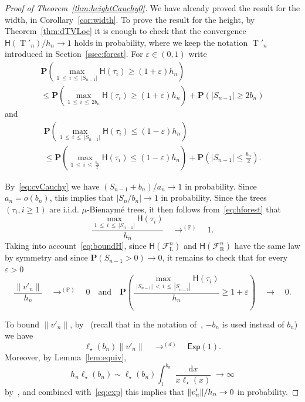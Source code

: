 \documentclass[10pt]{amsart}
\theoremstyle{definition}\newtheorem{defi}[theo]{Definition}\newtheorem{rema}[theo]{Remark}\newtheorem{exam}[theo]{Example}\newtheorem{exem}[theo]{Example}\newtheorem{nota}[theo]{Notation}
\renewcommand{\P}{\mathbb{P}}
\newcommand{\height}{\mathsf{H}}
\newcommand{\p}{\mathbf{P}}
\newcommand{\sExp}{\mathsf{Exp}}
\DeclareMathOperator{\rtree}{T}
\DeclareMathOperator{\dxseq}{d\mathit{x}}
\DeclareMathOperator{\rmL}{L}
\DeclareMathOperator{\rmR}{R}
\newcommand{\cF}{\mathcal{F}}
\begin{document}
\begin{proof}[Proof of Theorem~\ref{thm:heightCauchy0}] We have already proved the result for the width, in Corollary~\ref{cor:width}. To prove the result for the height, by Theorem~\ref{thm:dTVLoc} it is enough to check that the convergence ${\height(\rtree'_{n})}/{h_{n}} \rightarrow 1$ holds in probability, where we keep the notation $\rtree'_{n}$ introduced in Section~\ref{ssec:forest}. For $\varepsilon \in (0,1)$ write
\begin{multline*}
\p \left(\max_{1\,\leq\,i\,\leq\,|S_{n-1}|}\height(\tau_{i}) \geq (1+\varepsilon) h_{n} \right)\\
\leq \p \left(\max_{1\,\leq\,i\,\leq\,2 b_{n} }\height(\tau_{i}) \geq (1+\varepsilon) h_{n} \right)+\p \left(|S_{n-1}| \geq 2 b_{n} \right)
\end{multline*}
and
\begin{multline*}
\p \left(\max_{1\,\leq\,i\,\leq\,|S_{n-1}|}\height(\tau_{i}) \leq (1-\varepsilon) h_{n} \right)\\
\leq \p \left(\max_{1\,\leq\,i\,\leq\,\frac{ b_{n} }{2}}\height(\tau_{i}) \leq (1-\varepsilon) h_{n} \right)+\p \left(|S_{n-1}| \leq \frac{ b_{n} }{2} \right).
\end{multline*}


By~\eqref{eq:cvCauchy} we have $(S_{n-1}+b_n)/a_{n} \rightarrow 1$ in probability. Since $a_n=o(b_n)$, this implies that $|S_n/b_n| \to 1$ in probability. Since the trees $(\tau_i,i \ge 1)$ are i.i.d. $\mu$-Bienaymé trees, it then follows from~\eqref{eq:hforest} that
\begin{equation}\label{eq:cvproba}
\frac{\max_{1\, \leq\,i\,\leq\,|S_{n-1}|}\height(\tau_{i}) }{h_{n}} \quad \mathop{\longrightarrow}^{(\P)} \quad 1.
\end{equation}
Taking into account~\eqref{eq:boundH}, since $\height(\cF^{n}_{\rmL})$ and $\height(\cF^{n}_{\rmR})$ have the same law by symmetry and since $\p(S_{n-1}>0) \rightarrow 0$, it remains to check that for every $\varepsilon>0$
\begin{equation}\label{eq:rightforest}
\frac{\|v'_n\|}{h_{n}} \quad \mathop{\longrightarrow}^{(\P)} \quad 0 \quad \text{and} \quad \p \left(\frac{\max_{ |S_{n-1}|\,<\,i\,\leq\,|\underline{S}_{n-1}|}\height(\tau_{i})}{h_{n}} \geq 1+\varepsilon \right) \quad \longrightarrow\quad 0.
\end{equation}

To bound $\|v'_n\|$, by~\cite[Theorem~2 and Remark~18]{KR19} (recall that in the notation of~\cite{KR19}, $-b_{n}$ is used instead of $b_{n}$) we have
\begin{equation}\label{eq:exp}
{\ell_{\star}(b_{n})} \|v'_n\| \quad \mathop{\longrightarrow}^{(d)} \quad \sExp(1).
\end{equation}
Moreover, by Lemma~\ref{lem:equiv},
\[
h_{n} {\ell_{\star}(b_{n})} \sim \ell_{\star}(b_{n}) \int_{1}^{ b_{n} } \frac{\dxseq}{x \ell_{\star}(x)} \rightarrow \infty
\]
by~\cite[Proposition~1.5.9b]{BGT89}, and combined with~\eqref{eq:exp} this implies that $\|v'_n\|/h_{n} \linebreak\rightarrow 0$ in probability.


\end{proof}
\end{document}
